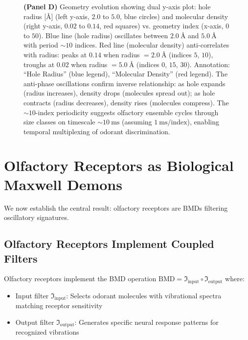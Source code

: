 \begin{figure}[htbp]
{    \textbf{(Panel D)} Geometry evolution showing dual y-axis plot: hole radius [\AA] (left y-axis, $2.0$ to $5.0$, blue circles) and molecular density (right y-axis, $0.02$ to $0.14$, red squares) vs. geometry index (x-axis, $0$ to $50$). Blue line (hole radius) oscillates between $2.0~\text{\AA}$ and $5.0~\text{\AA}$ with period $\sim 10$ indices. Red line (molecular density) anti-correlates with radius: peaks at $0.14$ when radius $= 2.0~\text{\AA}$ (indices $5$, $10$), troughs at $0.02$ when radius $= 5.0~\text{\AA}$ (indices $0$, $15$, $30$). Annotation: ``Hole Radius'' (blue legend), ``Molecular Density'' (red legend). The anti-phase oscillations confirm inverse relationship: as hole expands (radius increases), density drops (molecules spread out); as hole contracts (radius decreases), density rises (molecules compress). The $\sim 10$-index periodicity suggests olfactory ensemble cycles through size classes on timescale $\sim 10~\text{ms}$ (assuming $1~\text{ms/index}$), enabling temporal multiplexing of odorant discrimination.
    }
    \label{fig:olfactory_geometry}
\end{figure}


\section{Olfactory Receptors as Biological Maxwell Demons}

We now establish the central result: olfactory receptors are BMDs filtering oscillatory signatures.

\subsection{Olfactory Receptors Implement Coupled Filters}

\begin{theorem}
\label{thm:olfactory_bmd}
Olfactory receptors implement the BMD operation $\text{BMD} = \Im_{\text{input}} \circ \Im_{\text{output}}$ where:
\begin{itemize}
\item Input filter $\Im_{\text{input}}$: Selects odorant molecules with vibrational spectra matching receptor sensitivity
\item Output filter $\Im_{\text{output}}$: Generates specific neural response patterns for recognized vibrations
\end{itemize}
\end{theorem}

